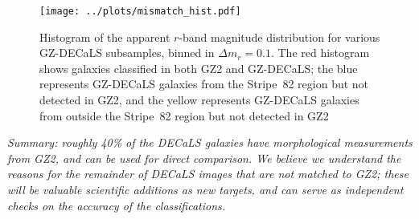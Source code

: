 \documentclass[iop,apj,tighten]{emulateapj}
\begin{document}
\begin{figure}
\centering
\texttt{[image: ../plots/mismatch\_hist.pdf]}
\caption{Histogram of the apparent $r$-band magnitude distribution for various GZ-DECaLS subsamples, binned in $\Delta m_r=0.1$. The red histogram shows galaxies classified in both GZ2 and GZ-DECaLS; the blue represents GZ-DECaLS galaxies from the Stripe~82 region but not detected in GZ2, and the yellow represents GZ-DECaLS galaxies from outside the Stripe~82 region but not detected in GZ2\label{fig:mismatch_hist}}
\end{figure}

\emph{Summary: roughly 40\% of the DECaLS galaxies have morphological measurements from GZ2, and can be used for direct comparison. We believe we understand the reasons for the remainder of DECaLS images that are not matched to GZ2; these will be valuable scientific additions as new targets, and can serve as independent checks on the accuracy of the classifications.}
\end{document}
